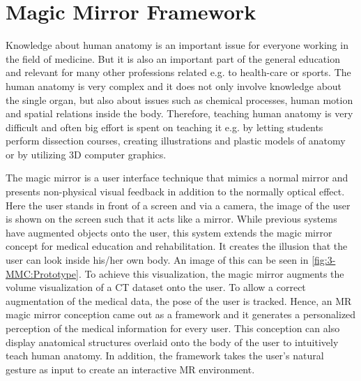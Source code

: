 \section{Magic Mirror Framework} \label{sec:3-PPMM:MMC}
Knowledge about human anatomy is an important issue for everyone working in the field of medicine. But it is also an important part of the general education and relevant for many other professions related e.g. to health-care or sports. The human anatomy is very complex and it does not only involve knowledge about the single organ, but also about issues such as chemical processes, human motion and spatial relations inside the body. Therefore, teaching human anatomy is very difficult and often big effort is spent on teaching it e.g. by letting students perform dissection courses, creating illustrations and plastic models of anatomy or by utilizing 3D computer graphics. 

The magic mirror\cite{Grosjean1999} is a user interface technique that mimics a normal mirror and presents non-physical visual feedback in addition to the normally optical effect. Here the user stands in front of a screen and via a camera, the image of the user is shown on the screen such that it acts like a mirror. 
While previous systems have augmented objects onto the user, this system extends the magic mirror concept for medical education and rehabilitation. It creates the illusion that the user can look inside his/her own body. An image of this can be seen in \figurename{\ref{fig:3-MMC:Prototype}}. To achieve this visualization, the magic mirror augments the volume visualization of a CT dataset onto the user. To allow a correct augmentation of the medical data, the pose of the user is tracked. Hence, an MR magic mirror conception came out as a framework and it generates a personalized perception of the medical information for every user. This conception can also display anatomical structures overlaid onto the body of the user to intuitively teach human anatomy. In addition, the framework takes the user's natural gesture as input to create an interactive MR environment. 


